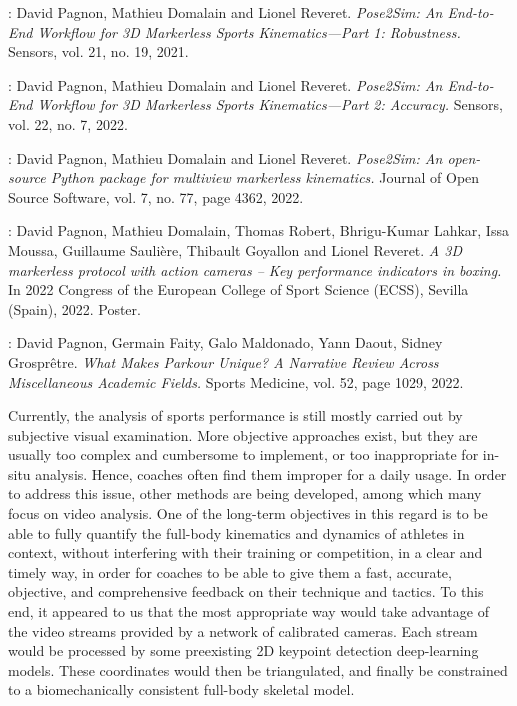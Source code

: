 \noindent\cite{Pagnon2021}: David Pagnon, Mathieu Domalain and Lionel Reveret. \textit{Pose2Sim: An
End-to-End Workflow for 3D Markerless Sports Kinematics—Part 1:
Robustness.} Sensors, vol. 21, no. 19, 2021.

\noindent\cite{Pagnon2022a}: David Pagnon, Mathieu Domalain and Lionel Reveret. \textit{Pose2Sim: An
End-to-End Workflow for 3D Markerless Sports Kinematics—Part 2:
Accuracy.} Sensors, vol. 22, no. 7, 2022.

\noindent\cite{Pagnon2022b}: David Pagnon, Mathieu Domalain and Lionel Reveret. \textit{Pose2Sim:
An open-source Python package for multiview markerless kinematics.}
Journal of Open Source Software, vol. 7, no. 77, page 4362, 2022.

\noindent\cite{Pagnon2022c}: 
David Pagnon, Mathieu Domalain, Thomas Robert, Bhrigu-Kumar Lahkar, Issa Moussa, Guillaume Saulière, Thibault Goyallon and Lionel Reveret. \textit{A 3D markerless protocol with action cameras – Key performance indicators in boxing.} In 2022 Congress of the European College of Sport Science (ECSS), Sevilla (Spain), 2022. Poster.


\noindent\cite{Pagnon2022d}: David Pagnon, Germain Faity, Galo Maldonado, Yann Daout, Sidney Grosprêtre. \textit{What Makes Parkour Unique? A Narrative Review Across Miscellaneous Academic Fields.} Sports Medicine, vol. 52, page 1029, 2022.


\vspace*{0.5cm}

Currently, the analysis of sports performance is still mostly carried out by subjective visual examination. More objective approaches exist, but they are usually too complex and cumbersome to implement, or too inappropriate for in-situ analysis. Hence, coaches often find them improper for a daily usage. In order to address this issue, other methods are being developed, among which many focus on video analysis. One of the long-term objectives in this regard is to be able to fully quantify the full-body kinematics and dynamics of athletes in context, without interfering with their training or competition, in a clear and timely way, in order for coaches to be able to give them a fast, accurate, objective, and comprehensive feedback on their technique and tactics. To this end, it appeared to us that the most appropriate way would take advantage of the video streams provided by a network of calibrated cameras. Each stream would be processed by some preexisting 2D keypoint detection deep-learning models. These coordinates would then be triangulated, and finally be constrained to a biomechanically consistent full-body skeletal model. 

